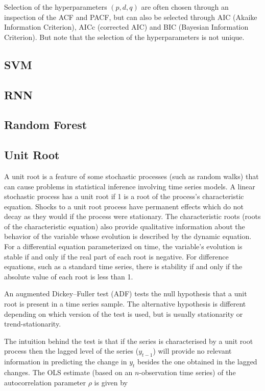 \documentclass[
  11pt,
]{article}
\begin{document}
Selection of the hyperparameters \((p, d, q)\) are often chosen through
an inspection of the ACF and PACF, but can also be selected through AIC
(Akaike Information Criterion), AICc (corrected AIC) and BIC (Bayesian
Information Criterion). But note that the selection of the
hyperparameters is not unique.

\hypertarget{svm}{%
\subsection{SVM}\label{svm}}

\hypertarget{rnn}{%
\subsection{RNN}\label{rnn}}

\hypertarget{random-forest}{%
\subsection{Random Forest}\label{random-forest}}

\hypertarget{unit-root}{%
\subsection{Unit Root}\label{unit-root}}

A unit root is a feature of some stochastic processes (such as random
walks) that can cause problems in statistical inference involving time
series models. A linear stochastic process has a unit root if 1 is a
root of the process's characteristic equation. Shocks to a unit root
process have permanent effects which do not decay as they would if the
process were stationary. The characteristic roots (roots of the
characteristic equation) also provide qualitative information about the
behavior of the variable whose evolution is described by the dynamic
equation. For a differential equation parameterized on time, the
variable's evolution is stable if and only if the real part of each root
is negative. For difference equations, such as a standard time series,
there is stability if and only if the absolute value of each root is
less than 1.

An augmented Dickey--Fuller test (ADF) tests the null hypothesis that a
unit root is present in a time series sample. The alternative hypothesis
is different depending on which version of the test is used, but is
usually stationarity or trend-stationarity.

The intuition behind the test is that if the series is characterised by
a unit root process then the lagged level of the series (\(y_{t-1}\))
will provide no relevant information in predicting the change in
\(y_{t}\) besides the one obtained in the lagged changes. The OLS
estimate (based on an \(n\)-observation time series) of the
autocorrelation parameter \(\rho\) is given by
\end{document}
